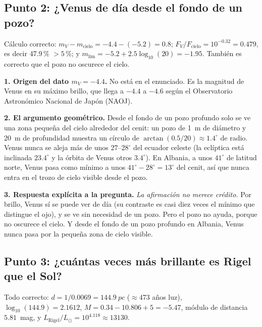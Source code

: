 \documentclass[11pt,a4paper]{article}
\begin{document}
\subsection{Punto 2: ¿Venus de día desde el fondo de un pozo?}
\begin{revision}
Cálculo correcto: $m_V - m_\text{cielo} = -4.4 - (-5.2) = 0.8$;
$F_V/F_\text{cielo} = 10^{-0.32} = 0.479$, es decir 47.9\,\% $> 5$\,\%; y
$m_\text{lím} = -5.2 + 2.5\log_{10}(20) = -1.95$. También es correcto que el pozo no oscurece el cielo.
\end{revision}

\begin{complemento}
\textbf{1. Origen del dato $m_V = -4.4$.} No está en el enunciado. Es la magnitud de Venus en su
máximo brillo, que llega a $-4.4$ a $-4.6$ según el Observatorio Astronómico Nacional de Japón (NAOJ).

\textbf{2. El argumento geométrico.} Desde el fondo de un pozo profundo solo se ve una zona pequeña
del cielo alrededor del cenit: un pozo de \SI{1}{m} de diámetro y \SI{20}{m} de profundidad muestra
un círculo de $\arctan(0.5/20) \approx 1.4^\circ$ de radio. Venus nunca se aleja más de unos
$27$--$28^\circ$ del ecuador celeste (la eclíptica está inclinada $23.4^\circ$ y la órbita de Venus
otros $3.4^\circ$). En Albania, a unos $41^\circ$ de latitud norte, Venus pasa como mínimo a unos
$41^\circ - 28^\circ = 13^\circ$ del cenit, así que nunca entra en el trozo de cielo visible desde el
pozo.

\textbf{3. Respuesta explícita a la pregunta.} \emph{La afirmación no merece crédito.} Por brillo,
Venus sí se puede ver de día (su contraste es casi diez veces el mínimo que distingue el ojo), y se ve
sin necesidad de un pozo. Pero el pozo no ayuda, porque no oscurece el cielo. Y desde el fondo de un
pozo profundo en Albania, Venus nunca pasa por la pequeña zona de cielo visible.
\end{complemento}

\subsection{Punto 3: ¿cuántas veces más brillante es Rigel que el Sol?}
\begin{revision}
Todo correcto: $d = 1/0.0069 = \SI{144.9}{pc}$ ($\approx 473$ años luz),
$\log_{10}(144.9) = 2.1612$, $M = 0.34 - 10.806 + 5 = -5.47$, módulo de distancia $5.81$~mag, y
$L_\text{Rigel}/L_\odot = 10^{4.118} \approx \num{13130}$.
\end{revision}
\end{document}

